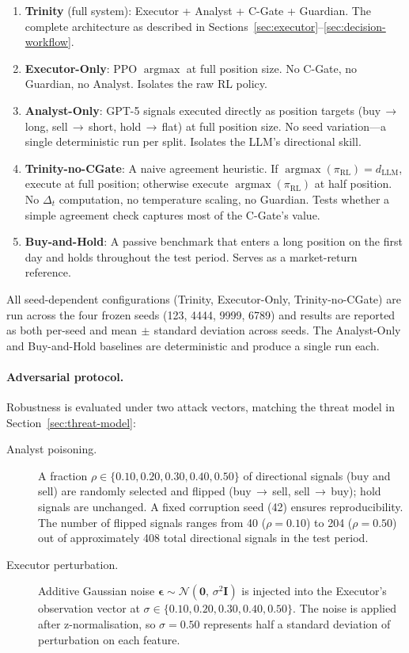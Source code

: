 \begin{enumerate}
  \item \textbf{Trinity} (full system): Executor + Analyst + C-Gate +
    Guardian. The complete architecture as described in
    Sections~\ref{sec:executor}--\ref{sec:decision-workflow}.
  \item \textbf{Executor-Only}: PPO $\operatorname{argmax}$ at full
    position size. No C-Gate, no Guardian, no Analyst. Isolates the raw
    RL policy.
  \item \textbf{Analyst-Only}: GPT-5 signals executed directly as
    position targets (buy$\,\rightarrow\,$long,
    sell$\,\rightarrow\,$short, hold$\,\rightarrow\,$flat) at full
    position size. No seed variation---a single deterministic run per
    split. Isolates the LLM's directional skill.
  \item \textbf{Trinity-no-CGate}: A naive agreement heuristic. If
    $\operatorname{argmax}(\pi_{\mathrm{RL}}) = d_{\mathrm{LLM}}$,
    execute at full position; otherwise execute
    $\operatorname{argmax}(\pi_{\mathrm{RL}})$ at half position. No
    $\Delta_t$ computation, no temperature scaling, no Guardian. Tests
    whether a simple agreement check captures most of the C-Gate's value.
  \item \textbf{Buy-and-Hold}: A passive benchmark that enters a long
    position on the first day and holds throughout the test period. Serves
    as a market-return reference.
\end{enumerate}

All seed-dependent configurations (Trinity, Executor-Only,
Trinity-no-CGate) are run across the four frozen seeds (123, 4444, 9999,
6789) and results are reported as both per-seed and mean$\,\pm\,$standard
deviation across seeds. The Analyst-Only and Buy-and-Hold baselines are
deterministic and produce a single run each.

\paragraph{Adversarial protocol.}
Robustness is evaluated under two attack vectors, matching the threat
model in Section~\ref{sec:threat-model}:

\begin{description}
  \item[Analyst poisoning.] A fraction $\rho \in \{0.10, 0.20, 0.30,
    0.40, 0.50\}$ of directional signals (buy and sell) are randomly
    selected and flipped (buy$\,\rightarrow\,$sell,
    sell$\,\rightarrow\,$buy); hold signals are unchanged. A fixed
    corruption seed (42) ensures reproducibility. The number of flipped
    signals ranges from 40 ($\rho = 0.10$) to 204 ($\rho = 0.50$) out of
    approximately 408 total directional signals in the test period.
  \item[Executor perturbation.] Additive Gaussian noise
    $\boldsymbol{\epsilon} \sim \mathcal{N}(\mathbf{0},\,
    \sigma^2 \mathbf{I})$ is injected into the Executor's observation
    vector at $\sigma \in \{0.10, 0.20, 0.30, 0.40, 0.50\}$. The noise
    is applied after z-normalisation, so $\sigma = 0.50$ represents half
    a standard deviation of perturbation on each feature.
\end{description}

